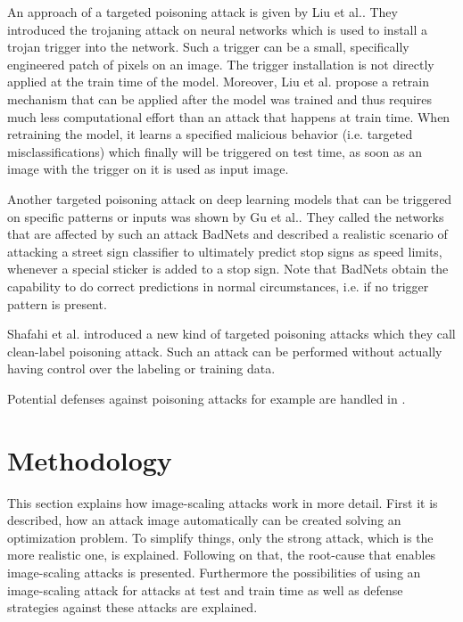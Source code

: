 \documentclass[sigconf]{acmart}
\begin{document}
An approach of a targeted poisoning attack is given by Liu et al.\cite{trojanattack}.
They introduced the trojaning attack on neural networks which is used to install a trojan trigger into the network.
Such a trigger can be a small, specifically engineered patch of pixels on an image.
The trigger installation is not directly applied at the train time of the model.
Moreover, Liu et al. propose a retrain mechanism that can be applied after the model was trained and thus requires much less computational effort than an attack that happens at train time.
When retraining the model, it learns a specified malicious behavior (i.e. targeted misclassifications) which finally will be triggered on test time, as soon as an image with the trigger on it is used as input image.

Another targeted poisoning attack on deep learning models that can be triggered on specific patterns or inputs was shown by Gu et al.\cite{8685687}.
They called the networks that are affected by such an attack BadNets and described a realistic scenario of attacking a street sign classifier to ultimately predict stop signs as speed limits, whenever a special sticker is added to a stop sign.
Note that BadNets obtain the capability to do correct predictions in normal circumstances, i.e. if no trigger pattern is present.

Shafahi et al.\cite{10.5555/3327345.3327509} introduced a new kind of targeted poisoning attacks which they call clean-label poisoning attack.
Such an attack can be performed without actually having control over the labeling or training data.

Potential defenses against poisoning attacks for example are handled in \cite{neuralCleanse, DBLP:journals/corr/abs-1905-13409}.

\section{Methodology}
This section explains how image-scaling attacks work in more detail.
First it is described, how an attack image automatically can be created solving an optimization problem.
To simplify things, only the strong attack, which is the more realistic one, is explained.
Following on that, the root-cause that enables image-scaling attacks is presented.
Furthermore the possibilities of using an image-scaling attack for attacks at test and train time as well as defense strategies against these attacks are explained.
\end{document}
